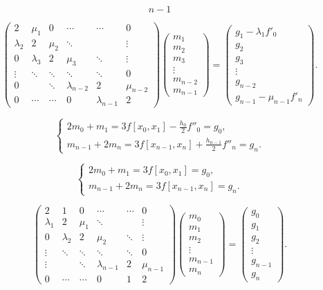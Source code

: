 \documentclass[fontset=fandol]{ctexart}
\begin{document}
\[n-1\]

\[\begin{pmatrix}
2&\mu_1&0&\cdots&\cdots&0\\
\lambda_2&2&\mu_2&\ddots&&\vdots\\
0&\lambda_3&2&\mu_3&\ddots&\vdots\\
\vdots&\ddots&\ddots&\ddots&\ddots&0\\
0&&\ddots&\lambda_{n-2}&2&\mu_{n-2}\\
0&\cdots&\cdots&0&\lambda_{n-1}&2
\end{pmatrix}
\begin{pmatrix}m_1\\m_2\\m_3\\\vdots\\m_{n-2}\\m_{n-1}\end{pmatrix}
=\begin{pmatrix}g_1-\lambda_1f'_0\\g_2\\g_3\\\vdots\\g_{n-2}\\g_{n-1}-\mu_{n-1}f'_n\end{pmatrix}.\tag{2.8.12}\]

\[\begin{cases}
\displaystyle2m_0+m_1=3f[x_0,x_1]-\frac{h_0}2f''_0=g_0,\\[6pt]
\displaystyle m_{n-1}+2m_n=3f[x_{n-1},x_n]+\frac{h_{n-1}}2f''_n=g_n.
\end{cases}\tag{2.8.13}\]

\[\begin{cases}
2m_0+m_1=3f[x_0,x_1]=g_0,\\
m_{n-1}+2m_n=3f[x_{n-1},x_n]=g_n.
\end{cases}\tag{2.8.13'}\]

\[\begin{pmatrix}
2&1&0&\cdots&\cdots&0\\
\lambda_1&2&\mu_1&\ddots&&\vdots\\
0&\lambda_2&2&\mu_2&\ddots&\vdots\\
\vdots&\ddots&\ddots&\ddots&\ddots&0\\
\vdots&&\ddots&\lambda_{n-1}&2&\mu_{n-1}\\
0&\cdots&\cdots&0&1&2
\end{pmatrix}
\begin{pmatrix}m_0\\m_1\\m_2\\\vdots\\m_{n-1}\\m_n\end{pmatrix}
=\begin{pmatrix}g_0\\g_1\\g_2\\\vdots\\g_{n-1}\\g_n\end{pmatrix}.\tag{2.8.14}\]
\end{document}
